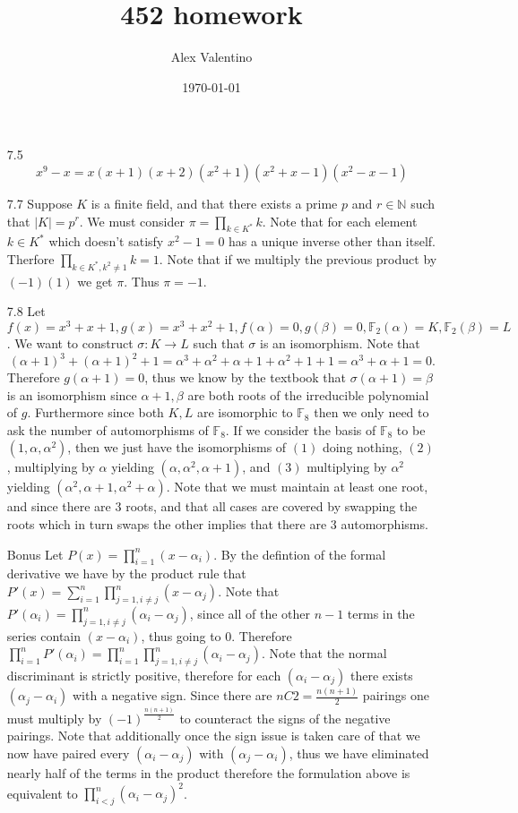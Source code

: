 \documentclass[12pt, letterpaper]{article}
\date{\today}
\author{Alex Valentino}
\title{452 homework}
\newcommand{\N}{\mathbb{N}}
\begin{document}
\begin{enumerate}
	\item[7.5]
	$$
		x^9 - x = x(x+1)(x+2)(x^2+1)(x^2+x-1)(x^2-x-1)
	$$
	\item[7.7] Suppose $K$ is a finite field, and that there exists a prime $p$ and $r \in \N$
	such that $|K| = p^r$.  We must consider $\pi = \prod_{k \in K^*} k$.  Note that for each 
	element $k \in K^*$ which doesn't satisfy $x^2 - 1 = 0$ has a unique inverse other than
	itself.  Therfore $\prod_{k \in K^*, k^2 \neq 1} k = 1$.  Note that if we multiply the
	previous product by $(-1)(1)$ we get $\pi$.  Thus $\pi = -1$. 
	\item[7.8] Let $f(x) = x^3 + x + 1, g(x) = x^3 + x^2 +1, f(\alpha) = 0, g(\beta) = 0, 
	\mathbb{F}_2(\alpha) = K, \mathbb{F}_2(\beta) = L$.  We want to construct 
	$\sigma : K \to L$ such that $\sigma$ is an isomorphism. Note that 
	$$
	(\alpha + 1)^3 + (\alpha + 1)^2 + 1 = 
	\alpha^3 + \alpha^2 + \alpha + 1 + \alpha^2 + 1 + 1 = \alpha^3 + \alpha + 1 = 0.
	$$
	Therefore $g(\alpha+1) = 0$, thus we know by the textbook that $\sigma(\alpha + 1) = \beta$
	is an isomorphism since $\alpha + 1, \beta$ are both roots of the irreducible polynomial of
	$g$.  Furthermore since both $K,L$ are isomorphic to $\mathbb{F}_8$ then we only need to ask
	the number of automorphisms of $\mathbb{F}_8$.  If we consider the basis of $\mathbb{F}_8$
	to be $(1,\alpha,\alpha^2)$, then we just have the isomorphisms of $(1)$ doing nothing, 
	$(2)$, multiplying by $\alpha$ yielding $(\alpha,\alpha^2,\alpha + 1)$, and $(3)$ 
	multiplying by $\alpha^2$ yielding $(\alpha^2, \alpha + 1, \alpha^2 + \alpha)$.  Note 
	that we must maintain at least one root, and since there are $3$ roots, and that all cases
	are covered by swapping the roots which in turn swaps the other implies that there are 3 
	automorphisms.
	\item[Bonus] Let $P(x) = \prod_{i=1}^n (x - \alpha_i)$.  By the defintion of the formal 
	derivative we have by the product rule that 
	$P'(x) = \sum_{i=1}^n \prod_{j=1, i \neq j}^n (x-\alpha_j)$.  Note that 
	$P'(\alpha_i) =  \prod_{j=1, i \neq j}^n (\alpha_i-\alpha_j)$, since all of the other 
	$n-1$ terms in the series contain $(x-\alpha_i)$, thus going to 0.  Therefore 
	$\prod_{i=1}^n P'(\alpha_i) = \prod_{i=1}^n \prod_{j=1, i \neq j}^n (\alpha_i-\alpha_j)$.
	Note that the normal discriminant is strictly positive, therefore for each 
	$(\alpha_i-\alpha_j)$ there exists $(\alpha_j-\alpha_i)$ with a negative sign.  Since there 
	are $nC2 = \frac{n(n+1)}{2}$ pairings one must multiply by $(-1)^{\frac{n(n+1)}{2}}$ to 
	counteract the signs of the negative pairings.  Note that additionally once the sign 
	issue is taken care of that we now have paired every $(\alpha_i-\alpha_j)$ with 
	$(\alpha_j-\alpha_i)$, thus we have eliminated nearly half of the terms in the product 
	therefore the formulation above is equivalent to $\prod_{i < j}^n (\alpha_i - \alpha_j)^2$.
\end{enumerate}
\end{document}
